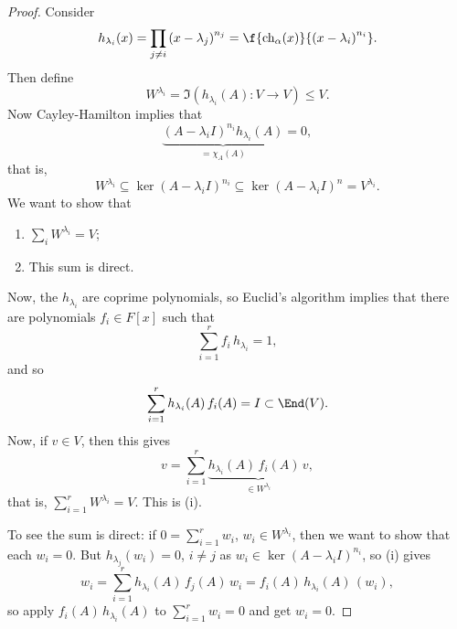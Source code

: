 \begin{proof}
	Consider
	\begin{equation*}
		h_{\lambda_i}(x)
		= \prod_{j\neq i} \left( x-\lambda_j \right)^{n_j}
		= \f{\chi_\alpha(x)}{\left( x-\lambda_i \right)^{n_i}}.
	\end{equation*}
	Then define
	\begin{equation*}
		W^{\lambda_i} = \Im\left( h_{\lambda_i}(A):V\to V \right) \leq V.
	\end{equation*}
	Now Cayley-Hamilton implies that
	\begin{equation*}
		\underbrace{\left( A-\lambda_iI \right)^{n_i} h_{\lambda_i}(A)}_{=\chi_A(A)} = 0,
	\end{equation*}
	that is,
	\begin{equation*}
		W^{\lambda_i}
		\subseteq \ker\left( A-\lambda_iI \right)^{n_i}
		\subseteq \ker\left( A-\lambda_iI \right)^n
		= V^{\lambda_i}.
	\end{equation*}
	We want to show that
	\begin{enumerate}
		\shortskip
		\item $\sum_i W^{\lambda_i}=V$;
		\item This sum is direct.
	\end{enumerate}
	Now, the $h_{\lambda_i}$ are coprime polynomials, so Euclid's algorithm implies that there are polynomials $f_i\in F[x]$ such that
	\begin{equation*}
		\sum_{i=1}^r f_i\,h_{\lambda_i}=1,
	\end{equation*}
	and so
	\begin{equation*}
		\sum_{i=1}^r h_{\lambda_i}(A)\,f_i(A) = I \subset \End(V).
	\end{equation*}
	Now, if $v\in V$, then this gives
	\begin{equation*}
		v=\sum_{i=1}^r \underbrace{h_{\lambda_i}(A) \,f_i(A)\,v}_{\in W^{\lambda_i}},
	\end{equation*}
	that is, $\sum_{i=1}^r W^{\lambda_i}=V$. This is (i).
	
	To see the sum is direct: if $0=\sum_{i=1}^r w_i$, $w_i\in W^{\lambda_i}$, then we want to show that each $w_i=0$. But $h_{\lambda_j}(w_i) = 0$, $i\neq j$ as $w_i\in\ker\left( A-\lambda_iI \right)^{n_i}$, so (i) gives
	\begin{equation*}
		w_i =
		\sum_{i=1}^r h_{\lambda_i}(A)\,f_j(A)\,w_i
		= f_i(A)\,h_{\lambda_i}(A)\,(w_i),
	\end{equation*}
	so apply $f_i(A)\,h_{\lambda_i}(A)$ to $\sum_{i=1}^r w_i=0$ and get $w_i=0$.
\end{proof}

